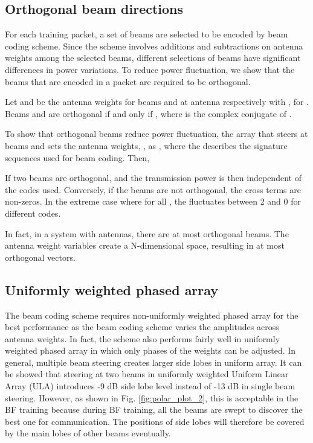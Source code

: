 \documentclass[10pt,conference]{IEEEtran}
\begin{document}
\subsection{Orthogonal beam directions} \label{sec:orthogonal}
For each training packet, a set of beams are selected to be encoded by beam coding scheme. Since the scheme involves additions and subtractions on antenna weights
among the selected beams, different selections of beams have significant differences in power variations. To reduce power fluctuation, we show that the beams that are encoded in a packet are required to be orthogonal.

\begin{definition}
Let  and  be the antenna
weights for beams  and  at antenna  respectively with , for . Beams  and
 are orthogonal if and only if , where  is the complex conjugate of
.
\end{definition}

To show that orthogonal beams reduce power fluctuation, the array that steers at beams  and  sets the antenna weights,
, as , where the 
describes the signature sequences used for beam coding. Then,
\begin{small}

\end{small}

If two beams are orthogonal,  and the transmission power is then
independent of the codes
used. Conversely, if the beams are
not orthogonal, the cross terms are non-zeros. In the extreme case
where  for all , the  fluctuates
between 2 and 0 for different codes.

In fact, in a system with  antennas, there are
at most  orthogonal beams\cite{poon05}. The  antenna weight variables create a N-dimensional space, resulting
in at most  orthogonal vectors.

\subsection{Uniformly weighted phased array}
The beam coding scheme requires non-uniformly weighted
phased array for the best performance as the beam coding scheme varies the amplitudes across antenna weights. In fact, the scheme
also performs fairly well in uniformly weighted phased array in which only phases of the
weights can be adjusted. In
general, multiple beam steering creates larger
side lobes in uniform array. It can be showed that steering at two beams in
uniformly weighted Uniform Linear Array (ULA) introduces -9 dB side lobe level instead of -13 dB
in single beam steering. However, as shown in Fig. \ref{fig:polar_plot_2},
this is acceptable in the BF training because during BF training, all the beams are swept to
discover the best one for communication. The positions of side lobes will therefore be covered by the main lobes of other beams eventually.
\end{document}
